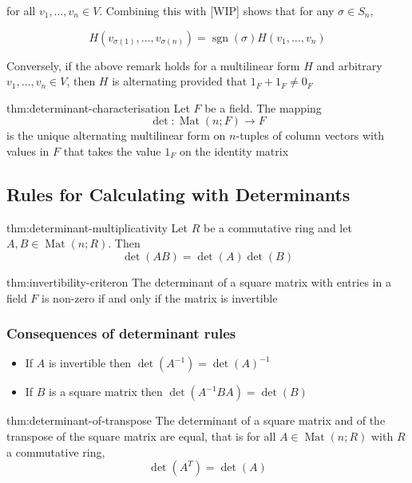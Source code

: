 \documentclass{article}
\DeclareMathOperator{\sgn}{sgn}
\DeclareMathOperator{\Mat}{Mat}
\begin{document}
for all $v_{1},\dots,v_{n}\in V$. Combining this with [WIP] shows that for any $\sigma\in S_{n}$,

\[ H(v_{\sigma(1)},\dots,v_{\sigma(n)}) = \sgn(\sigma)H(v_{1},\dots,v_{n})\]

Conversely, if the above remark holds for a multilinear form $H$ and arbitrary $v_{1},\dots,v_{n}\in V$, then $H$ is alternating provided that $1_{F} + 1_{F} \ne 0_{F}$

\begin{thm}{thm:determinant-characterisation}{}
    Let $F$ be a field. The mapping
    \[\det : \Mat(n;F) \to F\]
    is the unique alternating multilinear form on $n$-tuples of column vectors with values in $F$ that takes the value $1_{F}$ on the identity matrix
\end{thm}

\subsection{Rules for Calculating with Determinants}

\begin{thm}{thm:determinant-multiplicativity}{}
    Let $R$ be a commutative ring and let $A,B\in \Mat(n;R)$. Then
    \[\det(AB) = \det(A)\det(B)\]
\end{thm}

\begin{thm}{thm:invertibility-criteron}{}
    The determinant of a square matrix with entries in a field $F$ is non-zero if and only if the matrix is invertible
\end{thm}

\subsubsection{Consequences of determinant rules}
\begin{itemize}
    \item If $A$ is invertible then $\det(A^{-1}) = \det(A)^{-1}$
    \item If $B$ is a square matrix then $\det(A^{-1}BA) = \det(B)$
\end{itemize}



\begin{thm}{thm:determinant-of-transpose}{}
    The determinant of a square matrix and of the transpose of the square matrix are equal, that is for all $A\in \Mat(n;R)$ with $R$ a commutative ring,
    \[\det(A^{T}) = \det(A)\]
\end{thm}
\end{document}
